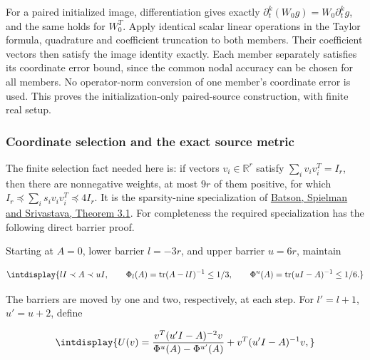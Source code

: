 For a paired initialized image, differentiation gives exactly \(\partial_t^k(W_0g)=W_0\partial_t^kg\), and the same holds for \(W_0^T\). Apply identical scalar linear operations in the Taylor formula, quadrature and coefficient truncation to both members. Their coefficient vectors then satisfy the image identity exactly. Each member separately satisfies its coordinate error bound, since the common nodal accuracy can be chosen for all members. No operator-norm conversion of one member's coordinate error is used. This proves the initialization-only paired-source construction, with finite real setup.


\subsubsection{Coordinate selection and the exact source metric}
\label{int:compact-selection-proof}
\label{int:harmonic-selection-proof}


The finite selection fact needed here is: if vectors \(v_i\in\mathbb R^r\) satisfy \(\sum_i v_iv_i^T=I_r\), then there are nonnegative weights, at most \(9r\) of them positive, for which \(I_r\preceq\sum_i s_iv_iv_i^T\preceq4I_r\). It is the sparsity-nine specialization of \href{https://www.cs.cmu.edu/~odonnell/hits09/batson-spielman-srivastava-twice-ramanujan-sparsifiers.pdf}{Batson, Spielman and Srivastava, Theorem 3.1}. For completeness the required specialization has the following direct barrier proof.



Starting at \(A=0\), lower barrier \(l=-3r\), and upper barrier \(u=6r\), maintain


\begingroup\renewcommand{\theHequation}{intdisplay.565}
\begin{equation*}
\intdisplay{
lI\prec A\prec uI,\qquad
\Phi_l(A)=\operatorname{tr}(A-lI)^{-1}\le1/3,\qquad
\Phi^u(A)=\operatorname{tr}(uI-A)^{-1}\le1/6.
}
\end{equation*}
\endgroup


The barriers are moved by one and two, respectively, at each step. For \(l'=l+1\), \(u'=u+2\), define


\begingroup\renewcommand{\theHequation}{intdisplay.566}
\begin{equation*}
\intdisplay{
U(v)=\frac{v^T(u'I-A)^{-2}v}{\Phi^u(A)-\Phi^{u'}(A)}
                         +v^T(u'I-A)^{-1}v,
}
\end{equation*}
\endgroup

